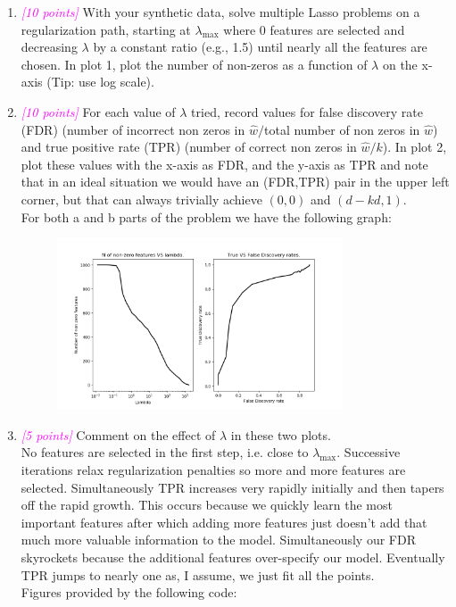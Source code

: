 \documentclass{article}
\newcommand{\1}{\mathbf{1}}
\newcommand{\points}[1]{\small\textcolor{magenta}{\emph{[#1 points]}} \normalsize}
\begin{document}
\begin{enumerate}
    \item \points{10} With your synthetic data, solve multiple Lasso problems on a regularization path, starting at $\lambda_{\max}$ where 0 features are selected and decreasing $\lambda$ by a constant ratio (e.g., 1.5) until nearly all the features are chosen. In plot 1, plot the number of non-zeros as a function of $\lambda$ on the x-axis (Tip: use log scale).
    \item \points{10} For each value of $\lambda$ tried, record values for false discovery rate (FDR) (number of incorrect non zeros in $\widehat w/$total number of non zeros in $\widehat w$) and true positive rate (TPR) (number of correct non zeros in $\widehat w/k$). In plot 2, plot these values with the x-axis as FDR, and the y-axis as TPR and note that in an ideal situation we would have an (FDR,TPR) pair in the upper left corner, but that can always trivially achieve $(0,0)$ and $(d-kd,1)$. \\
    For both a and b parts of the problem we have the following graph:
    \begin{figure}[h!]
        \centering
        \includegraphics[width=0.8\textwidth]{HW2/HW2_plots/CoordinateDescent.png}
    \end{figure}
    
    \newpage
    \item \points{5} Comment on the effect of $\lambda$ in these two plots. \\
    No features are selected in the first step, i.e. close to $\lambda_{\max}$. Successive iterations relax regularization penalties so more and more features are selected. Simultaneously TPR increases very rapidly initially and then tapers off the rapid growth. This occurs because we quickly learn the most important features after which adding more features just doesn't add that much more valuable information to the model. Simultaneously our FDR skyrockets because the additional features over-specify our model. Eventually TPR jumps to nearly one as, I assume, we just fit all the points. \\

Figures provided by the following code:
 
  
\end{enumerate}
\end{document}

